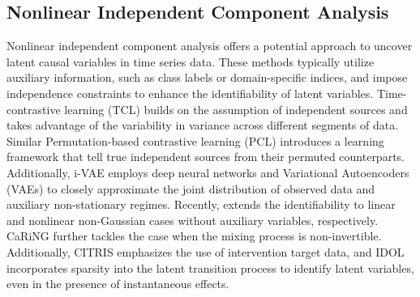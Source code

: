 \subsection{Nonlinear Independent Component Analysis}
Nonlinear independent component analysis offers a potential approach to uncover latent causal variables in time series data. These methods typically utilize auxiliary information, such as class labels or domain-specific indices, and impose independence constraints to enhance the identifiability of latent variables. Time-contrastive learning (TCL) \citep{hyvarinen2016unsupervised} builds on the assumption of independent sources and takes advantage of the variability in variance across different segments of data. Similar Permutation-based contrastive learning (PCL) \citep{hyvarinen2017nonlinear} introduces a learning framework that tell true independent sources from their permuted counterparts. Additionally, i-VAE \citep{khemakhem2020variational} employs deep neural networks and Variational Autoencoders (VAEs) to closely approximate the joint distribution of observed data and auxiliary non-stationary regimes. Recently, \cite{yao2021learning,yao2022temporally} extends the identifiability to linear and nonlinear non-Gaussian cases without auxiliary variables, respectively. CaRiNG \citep{chen2024caring} further tackles the case when the mixing process is non-invertible. Additionally, CITRIS \citep{lippe2022citris, lippe2023causal} emphasizes the use of intervention target data, and IDOL \citep{li2024identification} incorporates sparsity into the latent transition process to identify latent variables, even in the presence of instantaneous effects.

\vspace{-0.3cm}